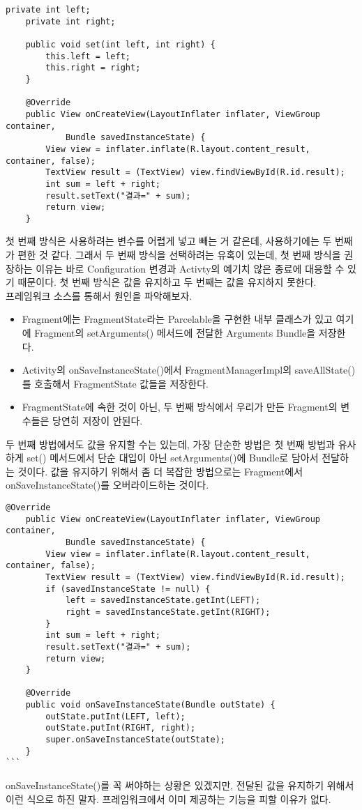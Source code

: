 \begin{lstlisting}[frame=single]
    private int left;
    private int right;

    public void set(int left, int right) {
        this.left = left;
        this.right = right;
    }

    @Override
    public View onCreateView(LayoutInflater inflater, ViewGroup container, 
    		Bundle savedInstanceState) {
        View view = inflater.inflate(R.layout.content_result, container, false);
        TextView result = (TextView) view.findViewById(R.id.result);
        int sum = left + right;
        result.setText("결과=" + sum);
        return view;
    }
\end{lstlisting}

첫 번째 방식은 사용하려는 변수를 어렵게 넣고 빼는 거 같은데, 사용하기에는 두 번째가 편한 것 같다.
그래서 두 번째 방식을 선택하려는 유혹이 있는데, 첫 번째 방식을 권장하는 이유는 바로 Configuration 변경과 Activty의 예기치 않은 종료에 대응할 수 있기 때문이다. 첫 번째 방식은 값을 유지하고 두 번째는 값을 유지하지 못한다.\\

프레임워크 소스를 통해서 원인을 파악해보자.
\begin{itemize}
\item Fragment에는 FragmentState라는 Parcelable을 구현한 내부 클래스가 있고 여기에 Fragment의 setArguments() 메서드에 전달한 Arguments Bundle을 저장한다.
\item Activity의 onSaveInstanceState()에서 FragmentManagerImpl의 saveAllState()를 호출해서 FragmentState 값들을 저장한다.
\item FragmentState에 속한 것이 아닌, 두 번째 방식에서 우리가 만든 Fragment의 변수들은 당연히 저장이 안된다.
\end{itemize}

두 번째 방법에서도 값을 유지할 수는 있는데, 가장 단순한 방법은 첫 번째 방법과 유사하게 set() 메서드에서 단순 대입이 아닌 setArguments()에 Bundle로 담아서 전달하는 것이다. 값을 유지하기 위해서 좀 더 복잡한 방법으로는 Fragment에서 onSaveInstanceState()를 오버라이드하는 것이다.
\begin{lstlisting}[frame=single]
    @Override
    public View onCreateView(LayoutInflater inflater, ViewGroup container, 
    		Bundle savedInstanceState) {
        View view = inflater.inflate(R.layout.content_result, container, false);
        TextView result = (TextView) view.findViewById(R.id.result);
        if (savedInstanceState != null) {
            left = savedInstanceState.getInt(LEFT);
            right = savedInstanceState.getInt(RIGHT);
        }
        int sum = left + right;
        result.setText("결과=" + sum);
        return view;
    }

    @Override
    public void onSaveInstanceState(Bundle outState) {
        outState.putInt(LEFT, left);
        outState.putInt(RIGHT, right);
        super.onSaveInstanceState(outState);
    }
```
\end{lstlisting}
onSaveInstanceState()를 꼭 써야하는 상황은 있겠지만, 전달된 값을 유지하기 위해서 이런 식으로 하진 말자. 프레임워크에서 이미 제공하는 기능을 피할 이유가 없다.\\

